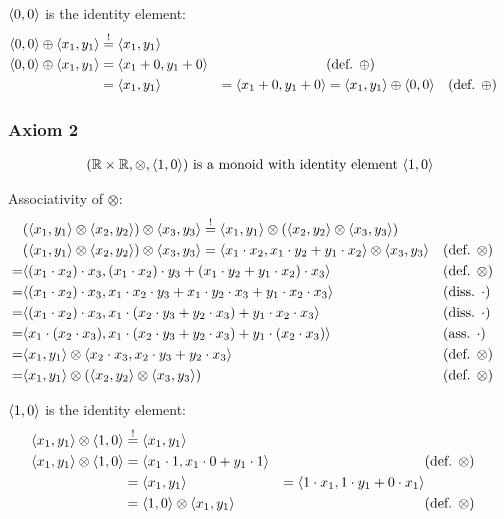 \documentclass[a4paper,12pt]{ETHexercise}
\begin{document}
$\langle0, 0\rangle$ is the identity element:
\begin{align}
    \langle0, 0\rangle \oplus \langle x_1, y_1\rangle &\stackrel{!}{=} \langle x_1, y_1\rangle\\
    \langle0, 0\rangle \oplus \langle x_1, y_1\rangle &= \langle x_1+0, y_1+0\rangle &&(\text{def. } \oplus)\\
    &=  \langle x_1, y_1\rangle
    &=  \langle x_1 + 0, y_1 + 0\rangle
    &= \langle x_1, y_1\rangle \oplus \langle0, 0\rangle &&(\text{def. } \oplus)
\end{align}

\subsubsection*{Axiom 2}
\begin{align*}
    (\mathbb{R} \times \mathbb{R}, \otimes, \langle1, 0\rangle) \text{ is a monoid with identity element } \langle1, 0\rangle
\end{align*}

Associativity of $\otimes$:
\begin{align}
    &(\langle x_1, y_1\rangle \otimes \langle x_2, y_2\rangle) \otimes \langle x_3, y_3\rangle \stackrel{!}{=} \langle x_1, y_1\rangle \otimes (\langle x_2, y_2\rangle \otimes \langle x_3, y_3\rangle)\\
    &(\langle x_1, y_1\rangle \otimes \langle x_2, y_2\rangle) \otimes \langle x_3, y_3\rangle =
    \langle x_1 \cdot x_2, x_1 \cdot y_2 + y_1 \cdot x_2\rangle \otimes \langle x_3, y_3\rangle &&(\text{def. } \otimes)\\
    =  &\langle(x_1 \cdot x_2) \cdot x_3, (x_1 \cdot x_2) \cdot y_3 + (x_1 \cdot y_2 + y_1 \cdot x_2) \cdot x_3\rangle &&(\text{def. } \otimes)\\
    =  &\langle(x_1 \cdot x_2) \cdot x_3, x_1 \cdot x_2 \cdot y_3 + x_1 \cdot y_2 \cdot x_3 + y_1 \cdot x_2 \cdot x_3 \rangle &&(\text{diss. } \cdot)\\ 
    =  &\langle(x_1 \cdot x_2) \cdot x_3, x_1 \cdot (x_2 \cdot y_3 + y_2 \cdot x_3) + y_1 \cdot x_2 \cdot x_3 \rangle &&(\text{diss. } \cdot)\\
    =  &\langle x_1 \cdot( x_2 \cdot x_3), x_1 \cdot (x_2 \cdot y_3 + y_2 \cdot x_3) + y_1 \cdot (x_2 \cdot x_3) \rangle &&(\text{ass. } \cdot)\\
    =  &\langle x_1, y_1\rangle \otimes \langle x_2 \cdot x_3, x_2 \cdot y_3 + y_2 \cdot x_3\rangle &&(\text{def. } \otimes)\\
    =  &\langle x_1, y_1\rangle \otimes (\langle x_2, y_2\rangle \otimes \langle x_3, y_3\rangle) &&(\text{def. } \otimes)
\end{align}


$\langle1, 0\rangle$ is the identity element:
\begin{align}
    \langle x_1, y_1\rangle \otimes \langle1, 0\rangle &\stackrel{!}{=} \langle x_1, y_1\rangle\\
    \langle x_1, y_1\rangle \otimes \langle1, 0\rangle &= \langle x_1 \cdot 1, x_1 \cdot 0 + y_1 \cdot 1\rangle &&(\text{def. } \otimes)\\
    &= \langle x_1, y_1\rangle
    &= \langle1 \cdot x_1, 1 \cdot y_1 + 0 \cdot x_1\rangle\\
    &= \langle1, 0\rangle \otimes \langle x_1, y_1\rangle &&(\text{def. } \otimes)
\end{align}
\end{document}
